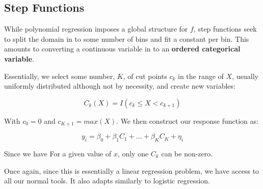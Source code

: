 \subsection{Step Functions}

While polynomial regression imposes a global structure for $f$, step functions seek to split the domain in to some number of bins and fit a constant per bin. This amounts to converting a continuous variable in to an \textbf{ordered categorical variable}.

Essentially, we select some number, $K$, of cut points $c_{k}$ in the range of $X$, usually uniformly distributed although not by necessity, and create new variables:

$$ C_{k}(X) = I(c_{k}\leq X < c_{k+1}) $$

With $c_{0} = 0$ and $c_{K+1} = max(X)$. We then construct our response function as:

$$ y_{i} = \beta_{0} + \beta_{1}C_{1} + ... + \beta_{K}C_{K} + \eta_{i} $$

Since we have For a given value of $x$, only one $C_{k}$ can be non-zero.

Once again, since this is essentially a linear regression problem, we have access to all our normal tools. It also adapts similarly to logistic regression.
